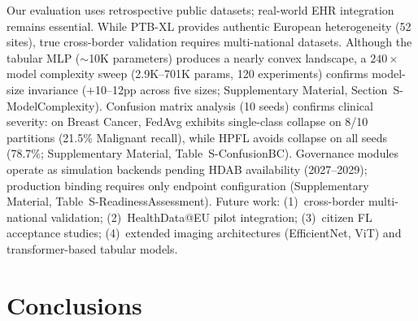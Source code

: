 \documentclass[conference]{IEEEtran}
\begin{document}
Our evaluation uses retrospective public datasets; real-world EHR integration remains essential. While PTB-XL provides authentic European heterogeneity (52 sites), true cross-border validation requires multi-national datasets. Although the tabular MLP ($\sim$10K parameters) produces a nearly convex landscape, a $240\times$ model complexity sweep (2.9K--701K params, 120 experiments) confirms model-size invariance ($+$10--12pp across five sizes; Supplementary Material, Section~S-ModelComplexity). Confusion matrix analysis (10 seeds) confirms clinical severity: on Breast Cancer, FedAvg exhibits single-class collapse on 8/10 partitions (21.5\% Malignant recall), while HPFL avoids collapse on all seeds (78.7\%; Supplementary Material, Table~S-ConfusionBC). Governance modules operate as simulation backends pending HDAB availability (2027--2029); production binding requires only endpoint configuration (Supplementary Material, Table~S-ReadinessAssessment). Future work: (1)~cross-border multi-national validation; (2)~HealthData@EU pilot integration; (3)~citizen FL acceptance studies; (4)~extended imaging architectures (EfficientNet, ViT) and transformer-based tabular models.

\section{Conclusions}
\label{sec:conclusions}
\end{document}
